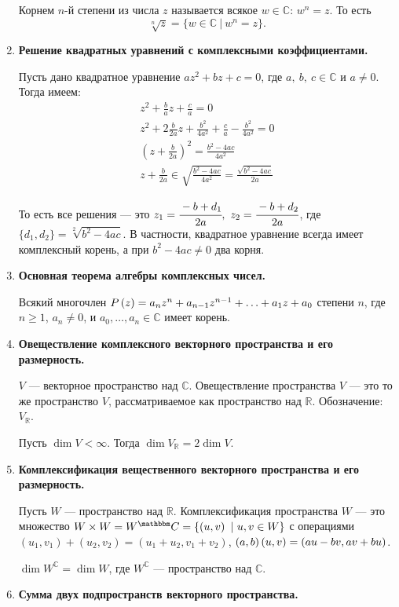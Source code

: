 \begin{enumerate}
Корнем $n$-й степени из числа $z$ называется всякое $w\in\mathbb C$: $w^n=z$. То есть
\[
\sqrt[n]{z} = \{w\in\mathbb C\ |\ w^n = z\}.
\]
\item \textbf{Решение квадратных уравнений с комплексными коэффициентами.}

Пусть дано квадратное уравнение $az^2+bz+c=0$, где $a,\ b,\ c\in\mathbb{C}$ и 	$ a \neq 0$. Тогда имеем:
\begin{gather*}
    z^2+\frac{b}{a}z+\frac{c}{a} = 0\\
    z^2+2\frac{b}{2a}z+\frac{b^2}{4a^2}+\frac{c}{a}-\frac{b^2}{4a^2} = 0\\
    \left(z+\frac{b}{2a}\right)^2=\frac{b^2-4ac}{4a^2}\\
    z+\frac{b}{2a} \in \sqrt{\frac{b^2-4ac}{4a^2}}=\frac{\sqrt{b^2-4ac}}{2a}
\end{gather*}

То есть все решения --- это $z_1 = \cfrac{-b+d_1}{2a},\ z_2 = \cfrac{-b+d_2}{2a}$, где $\{d_1,d_2\} = \sqrt[2]{b^2-4ac}$. В частности, квадратное уравнение всегда имеет комплексный корень, а при $b^2-4ac\neq0$ два корня.
\item \textbf{Основная теорема алгебры комплексных чисел.}

Всякий многочлен $P\left(z\right) = a_nz^n + a_{n-1}z^{n-1} + \ldots \hm{+} a_1z + a_0$ степени $n$, где $n \geqslant 1$, $a_n \neq 0$, и $a_0,\ldots,a_n \in \mathbb{C}$ имеет корень.
\item \textbf{Овеществление комплексного векторного пространства и его размерность.}

$V$ --- векторное пространство над $\mathbb{C}$. Овеществление пространства $V$ --- это то же пространство $V$, рассматриваемое как пространство над $\mathbb{R}$. Обозначение: $V_\mathbb{R}$.

Пусть $\dim V < \infty$. Тогда $\dim V_\mathbb{R} = 2\dim V$.
\item \textbf{Комплексификация вещественного векторного пространства и его размерность.}

Пусть $W$ --- пространство над $\mathbb{R}$. Комплексификация пространства $W$ --- это множество $W\times W = W^\mathbb{C} \hm{=} \{\left( u, v\right)\ |\ u,v \in W\}$ с операциями $\left(u_1, v_1\right) + \left(u_2, v_2\right) = \left(u_1+u_2, v_1+v_2\right)$, $\left(a, b\right)\left(u, v\right) \hm{=} \left(au-bv, av+bu\right)$.

$\dim W^\mathbb{C} = \dim W$, где $W^\mathbb{C}$ --- пространство над $\mathbb{C}$.
\item \textbf{Сумма двух подпространств векторного пространства.}


\end{enumerate}
